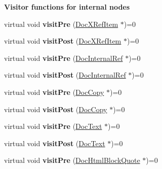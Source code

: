 \begin{Indent}{\bf Visitor functions for internal nodes}
\begin{DoxyCompactItemize}
\item 
\hypertarget{class_doc_visitor_a173a2fccfdd1af9c57df92b26093e534}{virtual void {\bfseries visit\-Pre} (\hyperlink{class_doc_x_ref_item}{Doc\-X\-Ref\-Item} $\ast$)=0}\label{class_doc_visitor_a173a2fccfdd1af9c57df92b26093e534}

\item 
\hypertarget{class_doc_visitor_a28bb4193a70ff11df25eccaca3447b89}{virtual void {\bfseries visit\-Post} (\hyperlink{class_doc_x_ref_item}{Doc\-X\-Ref\-Item} $\ast$)=0}\label{class_doc_visitor_a28bb4193a70ff11df25eccaca3447b89}

\item 
\hypertarget{class_doc_visitor_a0934f58eb0dd17493940562d3cc7d6f4}{virtual void {\bfseries visit\-Pre} (\hyperlink{class_doc_internal_ref}{Doc\-Internal\-Ref} $\ast$)=0}\label{class_doc_visitor_a0934f58eb0dd17493940562d3cc7d6f4}

\item 
\hypertarget{class_doc_visitor_a9444dc6ff174c62d06c6e400ba02aba7}{virtual void {\bfseries visit\-Post} (\hyperlink{class_doc_internal_ref}{Doc\-Internal\-Ref} $\ast$)=0}\label{class_doc_visitor_a9444dc6ff174c62d06c6e400ba02aba7}

\item 
\hypertarget{class_doc_visitor_af98a8843c343a69590cec15524551c48}{virtual void {\bfseries visit\-Pre} (\hyperlink{class_doc_copy}{Doc\-Copy} $\ast$)=0}\label{class_doc_visitor_af98a8843c343a69590cec15524551c48}

\item 
\hypertarget{class_doc_visitor_ad6f6308011a8eaf7219fa03a596df263}{virtual void {\bfseries visit\-Post} (\hyperlink{class_doc_copy}{Doc\-Copy} $\ast$)=0}\label{class_doc_visitor_ad6f6308011a8eaf7219fa03a596df263}

\item 
\hypertarget{class_doc_visitor_a06dfa5cf96f5c9025427a0c480304e19}{virtual void {\bfseries visit\-Pre} (\hyperlink{class_doc_text}{Doc\-Text} $\ast$)=0}\label{class_doc_visitor_a06dfa5cf96f5c9025427a0c480304e19}

\item 
\hypertarget{class_doc_visitor_ab99b67cf01ea59ef0c476202902767f6}{virtual void {\bfseries visit\-Post} (\hyperlink{class_doc_text}{Doc\-Text} $\ast$)=0}\label{class_doc_visitor_ab99b67cf01ea59ef0c476202902767f6}

\item 
\hypertarget{class_doc_visitor_aeb845b4798c0c136414304efd3b53dd3}{virtual void {\bfseries visit\-Pre} (\hyperlink{class_doc_html_block_quote}{Doc\-Html\-Block\-Quote} $\ast$)=0}\label{class_doc_visitor_aeb845b4798c0c136414304efd3b53dd3}


\end{DoxyCompactItemize}
\end{Indent}
